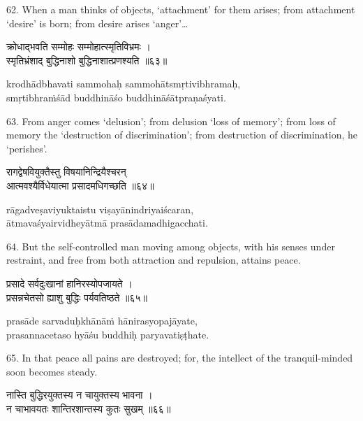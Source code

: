 62. When a man thinks of objects, `attachment' for them arises; from attachment
`desire' is born; from desire arises `anger'\ldots

\begin{gitaverse}
क्रोधाद्भवति सम्मोहः सम्मोहात्स्मृतिविभ्रमः । \\
स्मृतिभ्रंशाद् बुद्धिनाशो बुद्धिनाशात्प्रणश्यति ॥६३॥
\end{gitaverse}

\begin{transliteration}
krodhādbhavati sammohaḥ sammohātsmṛtivibhramaḥ, \\
smṛtibhraṁśād buddhināśo buddhināśātpraṇaśyati.
\end{transliteration}

63. From anger comes `delusion'; from delusion `loss of memory'; from loss of
memory the `destruction of discrimination'; from destruction of discrimination,
he `perishes'.

\begin{gitaverse}
रागद्वेषवियुक्तैस्तु विषयानिन्द्रियैश्चरन् \\
आत्मवश्यैर्विधेयात्मा प्रसादमधिगच्छति ॥६४॥
\end{gitaverse}

\begin{transliteration}
rāgadveṣaviyuktaistu viṣayānindriyaiścaran, \\
ātmavaśyairvidheyātmā prasādamadhigacchati.
\end{transliteration}

64. But the self-controlled man moving among objects, with his senses under
restraint, and free from both attraction and repulsion, attains peace.

\begin{gitaverse}
प्रसादे सर्वदुःखानां हानिरस्योपजायते । \\
प्रसन्नचेतसो ह्याशु बुद्धिः पर्यवतिष्ठते ॥६५॥
\end{gitaverse}

\begin{transliteration}
prasāde sarvaduḥkhānāṁ hānirasyopajāyate, \\
prasannacetaso hyāśu buddhiḥ paryavatiṣṭhate.
\end{transliteration}

65. In that peace all pains are destroyed; for, the intellect of the
tranquil-minded soon becomes steady.

\begin{gitaverse}
नास्ति बुद्धिरयुक्तस्य न चायुक्तस्य भावना । \\
न चाभावयतः शान्तिरशान्तस्य कुतः सुखम् ॥६६॥
\end{gitaverse}

